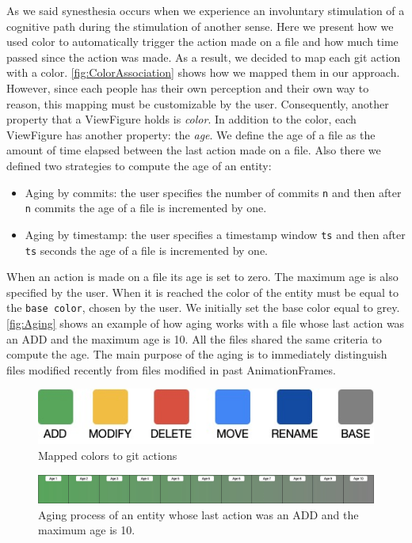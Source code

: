 As we said synesthesia occurs when we experience an involuntary stimulation of a cognitive path during the stimulation of another sense. Here we present how we used color to automatically trigger the action made on a file and how much time passed since the action was made. 
As a result, we decided to map each git action with a color. \autoref{fig:ColorAssociation} shows how we mapped them in our approach. However, since each people has their own perception and their own way to reason, this mapping must be customizable by the user. Consequently, another property that a ViewFigure holds is \textit{color}.
\bigbreak
In addition to the color, each ViewFigure has another property: the \textit{age}. We define the age of a file as the amount of time elapsed between the last action made on a file. Also there we defined two strategies to compute the age of an entity:

\begin{itemize}
    \item{Aging by commits}: the user specifies the number of commits \texttt{n} and then after \texttt{n} commits the age of a file is incremented by one. 
    \item{Aging by timestamp}:  the user specifies a timestamp window \texttt{ts} and then after \texttt{ts} seconds the age of a file is incremented by one.
\end{itemize}

When an action is made on a file its age is set to zero. 
\bigbreak
The maximum age is also specified by the user. When it is reached the color of the entity must be equal to the \texttt{base color}, chosen by the user. 
We initially set the base color equal to grey. \autoref{fig:Aging} shows an example of how aging works with a file whose last action was an ADD and the maximum age is 10. 
\bigbreak
All the files shared the same criteria to compute the age. The main purpose of the aging is to immediately distinguish files modified recently from files modified in past AnimationFrames.

\begin{figure}
    \center
    \includegraphics[width=0.\textwidth]{ColorMapping.jpg}
    \caption{Mapped colors to git actions}
    \label{fig:ColorAssociation}
\end{figure}


\begin{figure}
    \center
    \includegraphics[width=\textwidth]{Aging.jpg}
    \caption{Aging process of an entity whose last action was an ADD and the maximum age is 10. }
    \label{fig:Aging}
\end{figure}



